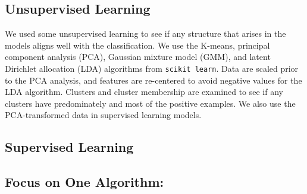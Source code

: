 \subsection{Unsupervised Learning}
We used some unsupervised learning to see if any structure that arises in the models aligns well with the classification.  We use the K-means, principal component analysis (PCA), Gaussian mixture model (GMM), and latent Dirichlet allocation (LDA) algorithms from \texttt{scikit learn}\cite{scikit-learn}.  Data are scaled prior to the PCA analysis, and features are re-centered to avoid negative values for the LDA algorithm.  Clusters and cluster membership are examined to see if any clusters have predominately and most of the positive examples. We also use the PCA-transformed data in supervised learning models.




\subsection{Supervised Learning}






\subsection{Focus on One Algorithm: }
